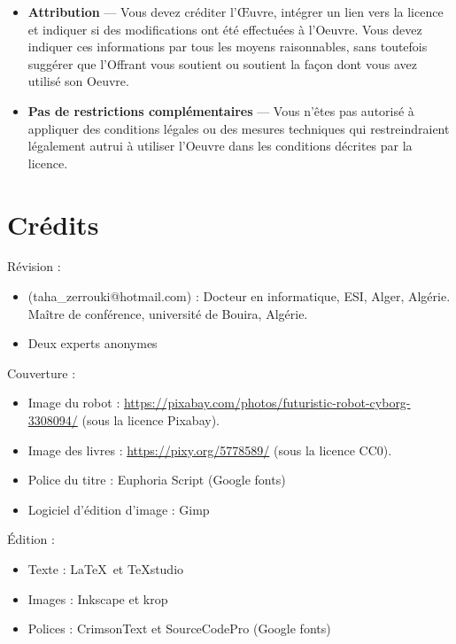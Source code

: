 \documentclass[12pt]{book}
\begin{document}
\begin{tcolorbox}[colback=my-grey,
	colframe=my-grey,  
	center, arc=0pt,outer arc=0pt,
	valign=top, 
	halign=left,
	width=\textwidth]
	\begin{itemize}
		\item[] \textbf{Attribution} — Vous devez créditer l'Œuvre, intégrer un lien vers la licence et indiquer si des modifications ont été effectuées à l'Oeuvre. Vous devez indiquer ces informations par tous les moyens raisonnables, sans toutefois suggérer que l'Offrant vous soutient ou soutient la façon dont vous avez utilisé son Oeuvre. 
		\item[] \textbf{Pas de restrictions complémentaires} — Vous n'êtes pas autorisé à appliquer des conditions légales ou des mesures techniques qui restreindraient légalement autrui à utiliser l'Oeuvre dans les conditions décrites par la licence.
	\end{itemize}
	
\end{tcolorbox}

\chapter*{Crédits}

Révision :
\begin{itemize}
	\item {} (taha\_zerrouki@hotmail.com) : Docteur en informatique, ESI, Alger, Algérie. Maître de conférence, université de Bouira, Algérie.
	\item Deux experts anonymes 
\end{itemize}

Couverture : 
\begin{itemize}
	\item Image du robot : \url{https://pixabay.com/photos/futuristic-robot-cyborg-3308094/} (sous la licence Pixabay).
	\item Image des livres : \url{https://pixy.org/5778589/} (sous la licence CC0).
	\item Police du titre : Euphoria Script (Google fonts)
	\item Logiciel d'édition d'image : Gimp
\end{itemize}

Édition :
\begin{itemize}
	\item Texte : \LaTeX\ et TeXstudio
	\item Images : Inkscape et krop
	\item Polices : CrimsonText et SourceCodePro (Google fonts)
\end{itemize}
\end{document}
